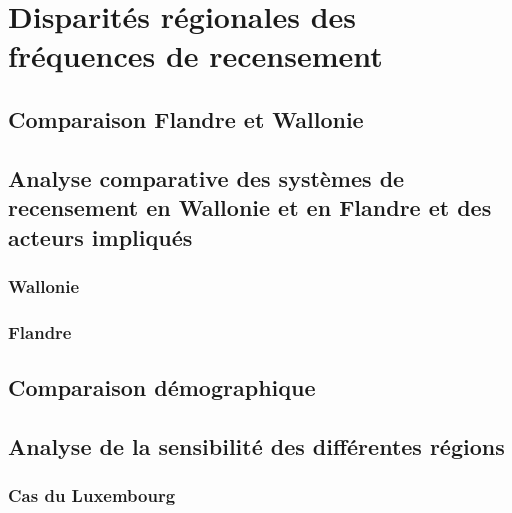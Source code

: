 \chapter{Disparités régionales des fréquences de recensement}

\section{Comparaison Flandre et Wallonie}

\section{Analyse comparative des systèmes de recensement en Wallonie et en Flandre et des acteurs impliqués}

\subsection{Wallonie}

\subsection{Flandre}

\section{Comparaison démographique}

\section{Analyse de la sensibilité des différentes régions}

\subsection{Cas du Luxembourg}